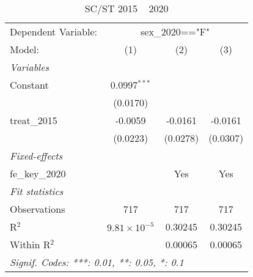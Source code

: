 
\begin{table}[htbp]
   \caption{SC/ST 2015 ~ 2020}
   \centering
   \begin{tabular}{lccc}
      \tabularnewline \midrule \midrule
      Dependent Variable: & \multicolumn{3}{c}{sex\_2020=="F"}\\
      Model:          & (1)                   & (2)      & (3)\\  
      \midrule
      \emph{Variables}\\
      Constant        & 0.0997$^{***}$        &          &   \\   
                      & (0.0170)              &          &   \\   
      treat\_2015     & -0.0059               & -0.0161  & -0.0161\\   
                      & (0.0223)              & (0.0278) & (0.0307)\\   
      \midrule
      \emph{Fixed-effects}\\
      fe\_key\_2020   &                       & Yes      & Yes\\  
      \midrule
      \emph{Fit statistics}\\
      Observations    & 717                   & 717      & 717\\  
      R$^2$           & $9.81\times 10^{-5}$  & 0.30245  & 0.30245\\  
      Within R$^2$    &                       & 0.00065  & 0.00065\\  
      \midrule \midrule
      \multicolumn{4}{l}{\emph{Signif. Codes: ***: 0.01, **: 0.05, *: 0.1}}\\
   \end{tabular}
\end{table}


